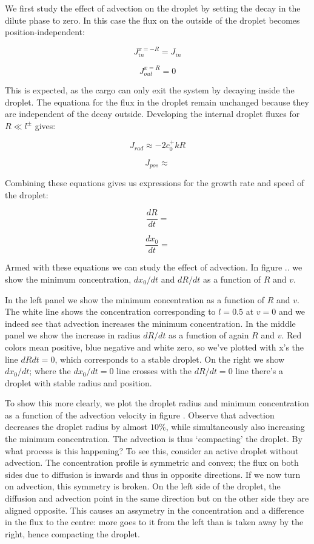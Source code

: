 \documentclass[12pt,a4paper,]{Dissertate}
\begin{document}
We first study the effect of advection on the droplet by setting the
decay in the dilute phase to zero. In this case the flux on the outside
of the droplet becomes position-independent:

\[
J_{in}^{x=-R} = J_{in}
\]

\[
J_{out}^{x=R} = 0
\]

This is expected, as the cargo can only exit the system by decaying
inside the droplet. The equationa for the flux in the droplet remain
unchanged because they are independent of the decay outside. Developing
the internal droplet fluxes for \(R\ll l^\pm\) gives:

\[
J_{rad}\approx -2 c_0^+kR
\]

\[
J_{pos}\approx
\]

Combining these equations gives us expressions for the growth rate and
speed of the droplet:

\[
\frac{dR}{dt}=
\]

\[
\frac{dx_0}{dt}=
\]

Armed with these equations we can study the effect of advection. In
figure .. we show the minimum concentration, \(dx_0/dt\) and \(dR/dt\)
as a function of \(R\) and \(v\).


In the left panel we show the minimum concentration as a function of
\(R\) and \(v\). The white line shows the concentration corresponding to
\(l=0.5\) at \(v=0\) and we indeed see that advection increases the
minimum concentration. In the middle panel we show the increase in
radius \(dR/dt\) as a function of again \(R\) and \(v\). Red colors mean
positive, blue negative and white zero, so we've plotted with x's the
line \(dRdt=0\), which corresponds to a stable droplet. On the right we
show \(dx_0/dt\); where the \(dx_0/dt=0\) line crosses with the
\(dR/dt=0\) line there's a droplet with stable radius and position.

To show this more clearly, we plot the droplet radius and minimum
concentration as a function of the advection velocity in figure .
Observe that advection decreases the droplet radius by almost \(10\%\),
while simultaneously also increasing the minimum concentration. The
advection is thus `compacting' the droplet. By what process is this
happening? To see this, consider an active droplet without advection.
The concentration profile is symmetric and convex; the flux on both
sides due to diffusion is inwards and thus in opposite directions. If we
now turn on advection, this symmetry is broken. On the left side of the
droplet, the diffusion and advection point in the same direction but on
the other side they are aligned opposite. This causes an assymetry in
the concentration and a difference in the flux to the centre: more goes
to it from the left than is taken away by the right, hence compacting
the droplet.
\end{document}
